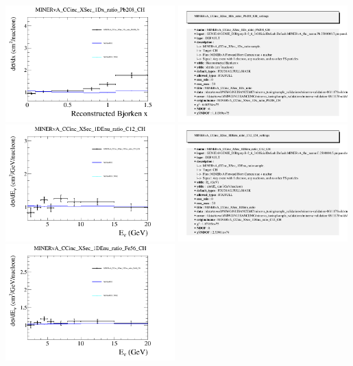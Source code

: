 \documentclass{article}
\begin{document}
\centering
\includegraphics[width=0.49\textwidth]{figures/nuisance_MINERvA_CCinc_XSec_1Dx_ratio_Pb208_CH_comp.png}
\includegraphics[width=0.49\textwidth]{figures/nuisance_MINERvA_CCinc_XSec_1Dx_ratio_Pb208_CH_info.png}
\centering
\includegraphics[width=0.49\textwidth]{figures/nuisance_MINERvA_CCinc_XSec_1DEnu_ratio_C12_CH_comp.png}
\includegraphics[width=0.49\textwidth]{figures/nuisance_MINERvA_CCinc_XSec_1DEnu_ratio_C12_CH_info.png}
\centering
\includegraphics[width=0.49\textwidth]{figures/nuisance_MINERvA_CCinc_XSec_1DEnu_ratio_Fe56_CH_comp.png}
\end{document}
